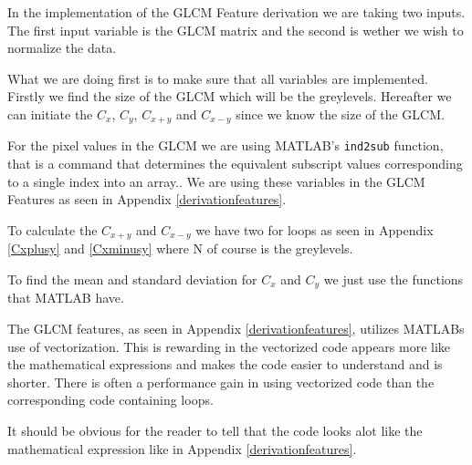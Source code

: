 
In the implementation of the GLCM Feature derivation we are taking two inputs. The first input variable is the GLCM matrix and the second is wether we wish to normalize the data.

What we are doing first is to make sure that all variables are implemented. Firstly we find the size of the GLCM which will be the greylevels. Hereafter we can initiate the $C_x$, $C_y$, $C_{x+y}$ and $C_{x-y}$ since we know the size of the GLCM.

For the pixel values in the GLCM we are using MATLAB's \texttt{ind2sub} function, that is a command that determines the equivalent subscript values corresponding to a single index into an array.. We are using these variables in the GLCM Features as seen in Appendix \ref{derivationfeatures}.

To calculate the $C_{x+y}$ and $C_{x-y}$ we have two for loops as seen in Appendix \ref{Cxplusy} and \ref{Cxminusy} where N of course is the greylevels. 

To find the mean and standard deviation for $C_x$ and $C_y$ we just use the functions that MATLAB have.

The GLCM features, as seen in Appendix \ref{derivationfeatures}, utilizes MATLABs use of vectorization. This is rewarding in the vectorized code appears more like the mathematical expressions and makes the code easier to understand and is shorter. There is often a performance gain in using vectorized code than the corresponding code containing loops.

It should be obvious for the reader to tell that the code looks alot like the mathematical expression like in Appendix \ref{derivationfeatures}.

